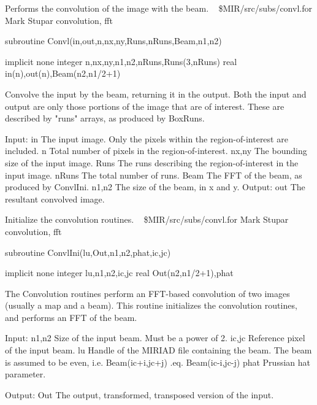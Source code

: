 %
\noindent Performs the convolution of the image with the beam.
\newline \ 
\newline {} \$MIR/src/subs/convl.for
\newline {} Mark Stupar
\newline {} convolution, fft
\par{\tenpoint
{\eightpoint\begintt
        subroutine Convl(in,out,n,nx,ny,Runs,nRuns,Beam,n1,n2)

        implicit none
        integer n,nx,ny,n1,n2,nRuns,Runs(3,nRuns)
        real in(n),out(n),Beam(n2,n1/2+1)

  Convolve the input by the beam, returning it in the output. Both the
  input and output are only those portions of the image that are of
  interest. These are described by "runs" arrays, as produced by
  BoxRuns.

  Input:
    in         The input image. Only the pixels within the
               region-of-interest are included.
    n          Total number of pixels in the region-of-interest.
    nx,ny      The bounding size of the input image.
    Runs       The runs describing the region-of-interest in the input
               image.
    nRuns      The total number of runs.
    Beam       The FFT of the beam, as produced by ConvlIni.
    n1,n2      The size of the beam, in x and y.
  Output:
    out        The resultant convolved image.
\endtt}
\par}
%
\noindent Initialize the convolution routines.
\newline \ 
\newline {} \$MIR/src/subs/convl.for
\newline {} Mark Stupar
\newline \abox{Keywords:} convolution, fft
\par{\tenpoint
{\eightpoint\begintt
        subroutine ConvlIni(lu,Out,n1,n2,phat,ic,jc)

        implicit none
        integer lu,n1,n2,ic,jc
        real Out(n2,n1/2+1),phat

  The Convolution routines perform an FFT-based convolution of two
  images (usually a map and a beam). This routine initializes the 
  convolution routines, and performs an FFT of the beam.

  Input:
    n1,n2      Size of the input beam. Must be a power of 2.
    ic,jc      Reference pixel of the input beam.
    lu         Handle of the MIRIAD file containing the beam. The beam
               is assumed to be even, i.e.
                 Beam(ic+i,jc+j) .eq. Beam(ic-i,jc-j)
    phat       Prussian hat parameter.

  Output:
    Out        The output, transformed, transposed version of the input.
\endtt}
\par}
